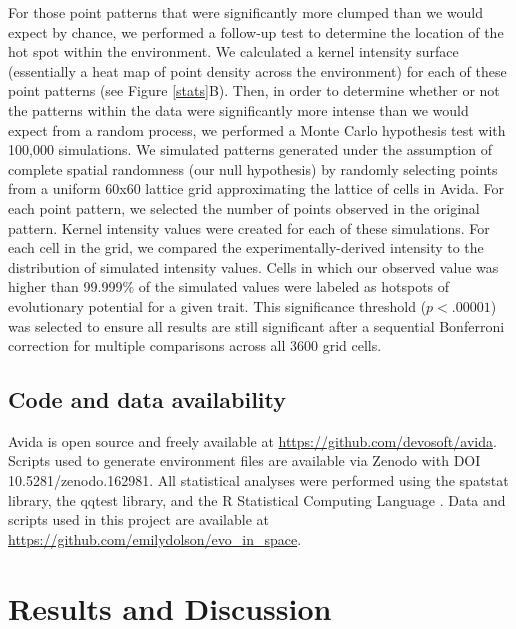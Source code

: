 For those point patterns that were significantly more clumped than we would expect by chance, we performed a follow-up test to determine the location of the hot spot within the environment. We calculated a kernel intensity surface (essentially a heat map of point density across the environment) for each of these point patterns (see Figure \ref{stats}B). Then, in order to determine whether or not the patterns within the data were significantly more intense than we would expect from a random process, we performed a Monte Carlo hypothesis test with 100,000 simulations. We simulated patterns generated under the assumption of complete spatial randomness (our null hypothesis) by randomly selecting points from a uniform 60x60 lattice grid approximating the lattice of cells in Avida.  For each point pattern, we selected the number of points observed in the original pattern. Kernel intensity values were created for each of these simulations. For each cell in the grid, we compared the experimentally-derived intensity to the distribution of simulated intensity values. Cells in which our observed value was higher than 99.999\% of the simulated values were labeled as hotspots of evolutionary potential for a given trait. This significance threshold ($p < .00001$) was selected to ensure all results are still significant after a sequential Bonferroni correction for multiple comparisons across all 3600 grid cells.

\subsection{Code and data availability}
Avida is open source and freely available at \href{https://github.com/devosoft/avida}{https://github.com/devosoft/avida}. Scripts used to generate environment files are available via Zenodo with DOI 10.5281/zenodo.162981. All statistical analyses were performed using the spatstat library, the qqtest library, and the R Statistical Computing Language \citep{baddeley_spatial_2015,oldford_qqtest:_2016, team_r:_2013}. Data and scripts used in this project are available at \href{https://github.com/emilydolson/evo_in_space}{https://github.com/emilydolson/evo\_in\_space}.

\section{Results and Discussion}
